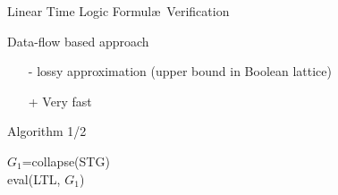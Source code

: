 \newcommand{\lub}{\ensuremath{\sqcup}\xspace}
\newcommand{\Lub}{\ensuremath{\bigsqcup}\xspace}
\newcommand{\state}{\ensuremath{\mathit{s}}\xspace}
\newcommand{\STG}{\ensuremath{\mathrm{STG}}\xspace}
\newcommand{\States}{\ensuremath{\mathit{States}}\xspace}
\newcommand{\prop}[1]{\ensuremath{p_{\state,#1}}\xspace} 
\newcommand{\propp}[1]{\ensuremath{p_{\state',#1}}\xspace} 
\newcommand{\G}{\ensuremath{\mathrm{G}}\xspace}
\newcommand{\F}{\ensuremath{\mathrm{F}}\xspace}
\newcommand{\X}{\ensuremath{\mathrm{X}}\xspace}
\newcommand{\R}{\ensuremath{\mathrm{R}}\xspace}
\newcommand{\U}{\ensuremath{\mathrm{U}}\xspace}
\newcommand{\WU}{\ensuremath{\mathrm{WU}\xspace}}
\newcommand{\comb}{\ensuremath{\mathit{succs}}\xspace}


\begin{frame}{Linear Time Logic Formul\ae\ Verification}

  \begin{block}{Data-flow based approach}
    \begin{itemize}
    \item[-] lossy approximation (upper bound in Boolean lattice)
    \item[+] Very fast
    \end{itemize}
  \end{block}

  \begin{block}{Algorithm 1/2}
    \footnotesize
    \begin{algorithm}[H]
      \SetLine

      $G_1$=collapse(STG) \\
      eval(LTL, $G_1$) 
    \end{algorithm}
  \end{block}
\end{frame}

